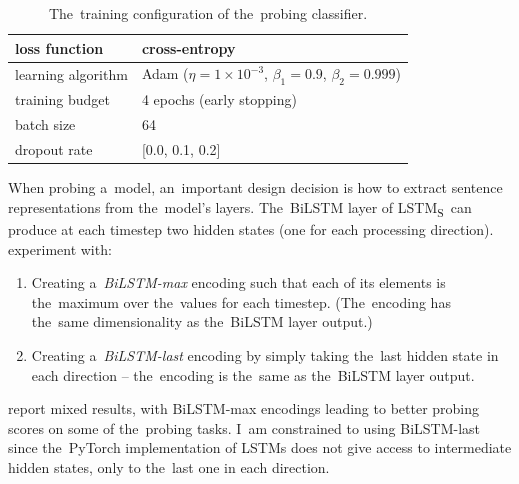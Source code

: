 \documentclass[bsc,frontabs,singlespacing,parskip,deptreport]{infthesis}
\def\LSTMS{LSTM\textsubscript{S}}
\begin{document}
{{{       %
      \begin{table}[h!t]
      \centering
      \footnotesize
      \begin{tabular}{m{} m{}}
      \toprule
      loss function & cross-entropy \\
      \hline
      learning algorithm & Adam ($\eta=1\times10^{-3}$, $\beta_1=0.9$, $\beta_2=0.999$) \\
      \hline
      training budget & 4 epochs (early stopping) \\
      \hline
      batch size & 64 \\
      \hline
      dropout rate &  [0.0, 0.1, 0.2]\\
      \bottomrule
      \end{tabular}
      \caption{The~training configuration of the~probing classifier.}
      \label{tab:config-probing-classifier}
      \end{table}

      When probing a~model, an~important design decision is how to extract sentence representations from the~model's layers.
      The~BiLSTM layer of \LSTMS~can produce at each timestep two hidden states (one for each processing direction). \citeauthor{Conneau_2018} experiment with:
      \begin{enumerate}
        \item Creating a~\textit{BiLSTM-max} encoding such that each of its elements is the~maximum over the~values for each timestep. (The~encoding has the~same dimensionality as the~BiLSTM layer output.)
        \item Creating a~\textit{BiLSTM-last} encoding by simply taking the~last hidden state in each direction -- the~encoding is the~same as the~BiLSTM layer output.
      \end{enumerate}
      \citeauthor{Conneau_2018} report mixed results, with BiLSTM-max encodings leading to better probing scores on some of the~probing tasks. I~am constrained to using BiLSTM-last since the~PyTorch implementation of LSTMs does not give access to intermediate hidden states, only to the~last one in each direction.

}}}
\end{document}
